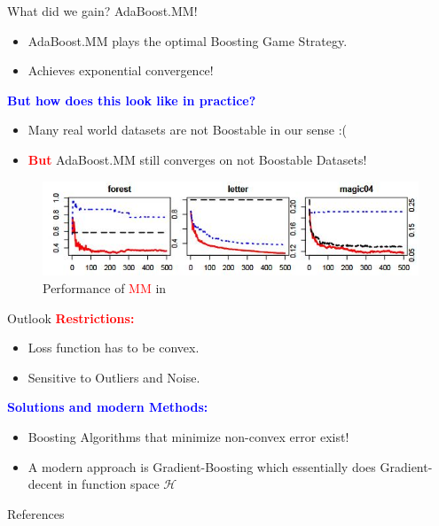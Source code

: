\documentclass{beamer}
\begin{document}
\begin{frame}{What did we gain? AdaBoost.MM!}
    \begin{itemize}
        \item AdaBoost.MM plays the optimal Boosting Game Strategy.
        \item Achieves exponential convergence!
    \end{itemize}
    \bigbreak
    \textbf{\textcolor{blue}{But how does this look like in practice?}} \\
    \begin{itemize}
        \item Many real world datasets are not Boostable in our sense :(
        \item \textbf{\textcolor{red}{But}} AdaBoost.MM still converges on not Boostable Datasets!
    \end{itemize}
    \bigbreak
    \begin{center}
        \begin{figure}
            \centering
            \includegraphics[width=0.8\linewidth]{images/MMperformance.JPG}
            \caption{\small Performance of \textcolor{red}{MM} in \cite{mukherjee2011theory}}
            \label{fig:Performance}
        \end{figure}
    \end{center}
    \begin{figure}

    \end{figure}
\end{frame}

\begin{frame}{Outlook}
    \textbf{\textcolor{red}{Restrictions:}}
    \begin{itemize}
        \item Loss function has to be convex.
        \item Sensitive to Outliers and Noise.
    \end{itemize}
    \bigbreak
    \textbf{\textcolor{blue}{Solutions and modern Methods:}}
    \begin{itemize}
        \item Boosting Algorithms that minimize non-convex error \cite{pfetsch2020ipboost} exist!
        \item A modern approach is Gradient-Boosting which essentially does Gradient-decent in function space $\mathcal{H}$
    \end{itemize}

\end{frame}

\begin{frame}{References}
    \printbibliography
\end{frame}

\end{document}

